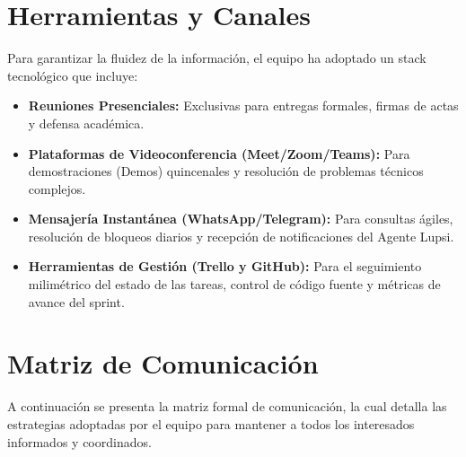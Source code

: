 \documentclass[a4paper,12pt]{article}
\begin{document}
\section{Herramientas y Canales}
Para garantizar la fluidez de la información, el equipo ha adoptado un stack tecnológico que incluye:
\begin{itemize}
    \item \textbf{Reuniones Presenciales:} Exclusivas para entregas formales, firmas de actas y defensa académica.
    \item \textbf{Plataformas de Videoconferencia (Meet/Zoom/Teams):} Para demostraciones (Demos) quincenales y resolución de problemas técnicos complejos.
    \item \textbf{Mensajería Instantánea (WhatsApp/Telegram):} Para consultas ágiles, resolución de bloqueos diarios y recepción de notificaciones del Agente Lupsi.
    \item \textbf{Herramientas de Gestión (Trello y GitHub):} Para el seguimiento milimétrico del estado de las tareas, control de código fuente y métricas de avance del sprint.
\end{itemize}

\section{Matriz de Comunicación}
A continuación se presenta la matriz formal de comunicación, la cual detalla las estrategias adoptadas por el equipo para mantener a todos los interesados informados y coordinados.
\end{document}
